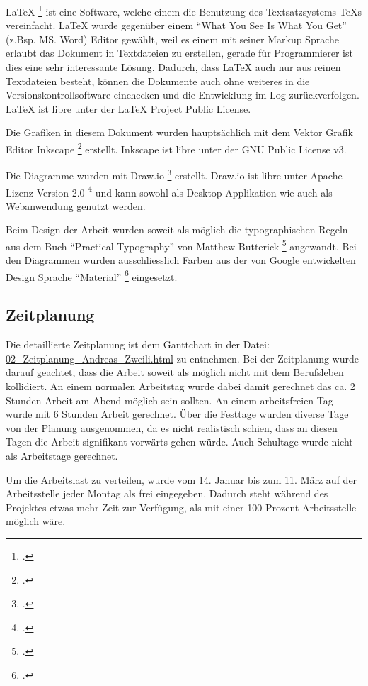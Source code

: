 \LaTeX{} \footcite{latex} ist eine Software, welche einem die Benutzung des
Textsatzsystems TeXs vereinfacht. \LaTeX{} wurde gegenüber einem "`What You See Is
What You Get"' (z.Bsp. MS. Word) Editor gewählt, weil es einem mit seiner Markup
Sprache erlaubt das Dokument in Textdateien zu erstellen, gerade für
Programmierer ist dies eine sehr interessante Lösung. Dadurch, dass \LaTeX{} auch
nur aus reinen Textdateien besteht, können die Dokumente auch ohne weiteres
in die Versionskontrollsoftware einchecken und die Entwicklung im Log
zurückverfolgen. \LaTeX{} ist \gls{libre} unter der \LaTeX{} Project Public
License.

Die Grafiken in diesem Dokument wurden hauptsächlich mit dem Vektor Grafik
Editor Inkscape \footcite{inkscape} erstellt. Inkscape ist \gls{libre} unter der
GNU Public License v3.

Die Diagramme wurden mit Draw.io \footcite{draw} erstellt. Draw.io ist \gls{libre}
unter Apache Lizenz Version 2.0 \footcite{apache} und kann sowohl als Desktop
Applikation wie auch als Webanwendung genutzt werden.

Beim Design der Arbeit wurden soweit als möglich die typographischen Regeln aus
dem Buch "`Practical Typography"' von Matthew Butterick \footcite{typo} angewandt.
Bei den Diagrammen wurden ausschliesslich Farben aus der von Google
entwickelten Design Sprache "`Material"' \footcite{material} eingesetzt.
\pagebreak
\subsection{Zeitplanung}
\label{sec:org3e1f3c8}

Die detaillierte Zeitplanung ist dem Ganttchart in der Datei:\newline
\href{02\_Zeitplanung\_Andreas\_Zweili.html}{02\_Zeitplanung\_Andreas\_Zweili.html}
zu entnehmen. Bei der Zeitplanung wurde darauf geachtet, dass die Arbeit soweit
als möglich nicht mit dem Berufsleben kollidiert. An einem normalen Arbeitstag
wurde dabei damit gerechnet das ca. 2 Stunden Arbeit am Abend möglich sein
sollten. An einem arbeitsfreien Tag wurde mit 6 Stunden Arbeit gerechnet. Über
die Festtage wurden diverse Tage von der Planung ausgenommen, da es nicht
realistisch schien, dass an diesen Tagen die Arbeit signifikant vorwärts gehen
würde. Auch Schultage wurde nicht als Arbeitstage gerechnet.

Um die Arbeitslast zu verteilen, wurde vom 14. Januar bis zum 11. März auf der
Arbeitsstelle jeder Montag als frei eingegeben. Dadurch steht während des
Projektes etwas mehr Zeit zur Verfügung, als mit einer 100 Prozent
Arbeitsstelle möglich wäre.

